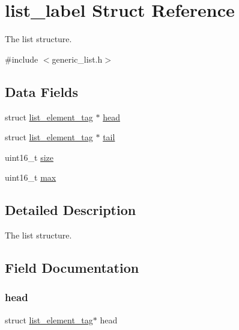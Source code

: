 \hypertarget{structlist__label}{}\section{list\+\_\+label Struct Reference}
\label{structlist__label}


The list structure.  




{\ttfamily \#include $<$generic\+\_\+list.\+h$>$}

\subsection*{Data Fields}
\begin{DoxyCompactItemize}
\item 
struct \mbox{\hyperlink{structlist__element__tag}{list\+\_\+element\+\_\+tag}} $\ast$ \mbox{\hyperlink{structlist__label_a6d719fc51eaee5164530e357814a27eb}{head}}
\item 
struct \mbox{\hyperlink{structlist__element__tag}{list\+\_\+element\+\_\+tag}} $\ast$ \mbox{\hyperlink{structlist__label_ad9735ff98cf587287750ced69a81f231}{tail}}
\item 
uint16\+\_\+t \mbox{\hyperlink{structlist__label_aaba88b24a21a6c70c895c0d55f4a69a0}{size}}
\item 
uint16\+\_\+t \mbox{\hyperlink{structlist__label_ac66b569507cc273bbf83ce5dd5f70e84}{max}}
\end{DoxyCompactItemize}


\subsection{Detailed Description}
The list structure. 

\subsection{Field Documentation}
\mbox{\label{structlist__label_a6d719fc51eaee5164530e357814a27eb}} 
\subsubsection{\texorpdfstring{head}{head}}
{\footnotesize\ttfamily struct \mbox{\hyperlink{structlist__element__tag}{list\+\_\+element\+\_\+tag}}$\ast$ head}

